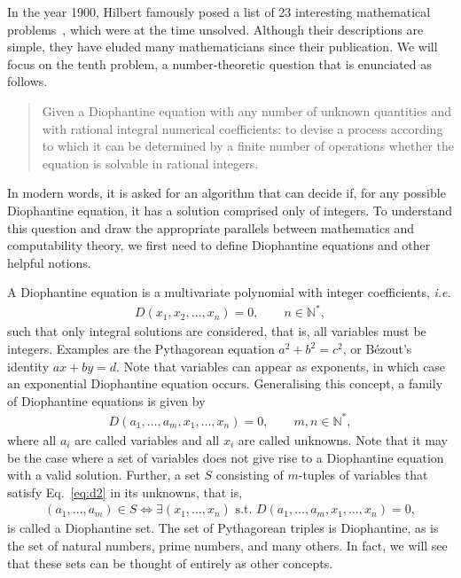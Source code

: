 \documentclass[12pt]{article}
\begin{document}
In the year 1900, Hilbert famously posed a list of 23 interesting mathematical problems~\cite{}, which were at the time unsolved. Although their descriptions are simple, they have eluded many mathematicians since their publication. We will focus on the tenth problem, a number-theoretic question that is enunciated as follows.

\begin{quote}
    Given a Diophantine equation with any number of unknown quantities and with rational integral numerical coefficients: to devise a process according to which it can be determined by a finite number of operations whether the equation is solvable in rational integers.
\end{quote}

In modern words, it is asked for an algorithm that can decide if, for any possible Diophantine equation, it has a solution comprised only of integers. To understand this question and draw the appropriate parallels between mathematics and computability theory, we first need to define Diophantine equations and other helpful notions.

A Diophantine equation is a multivariate polynomial with integer coefficients, \emph{i.e.}
\begin{align}
    D(x_{1}, x_{2}, \dots, x_{n}) = 0, \qquad n \in \mathbb{N}^{*}, \label{eq:d}
\end{align}
such that only integral solutions are considered, that is, all variables must be integers. Examples are the Pythagorean equation $a^{2} + b^{2} = c^{2}$, or Bézout's identity $ax + by = d$. Note that variables can appear as exponents, in which case an exponential Diophantine equation occurs. Generalising this concept, a family of Diophantine equations is given by
\begin{align}
    D(a_{1}, \dots, a_{m}, x_{1}, \dots, x_{n}) = 0, \qquad m, n \in \mathbb{N}^{*}, \label{eq:d2}
\end{align}
where all $a_{i}$ are called variables and all $x_{i}$ are called unknowns. Note that it may be the case where a set of variables does not give rise to a Diophantine equation with a valid solution. Further, a set $S$ consisting of $m$-tuples of variables that satisfy Eq.~\ref{eq:d2} in its unknowns, that is,
\begin{align}
    (a_{1}, \dots, a_{m}) \in S \Leftrightarrow \exists (x_{1}, \dots, x_{n}) \text{ s.t. } D(a_{1}, \dots, a_{m}, x_{1}, \dots, x_{n}) = 0,
\end{align}
is called a Diophantine set. The set of Pythagorean triples is Diophantine, as is the set of natural numbers, prime numbers, and many others. In fact, we will see that these sets can be thought of entirely as other concepts.
\end{document}
